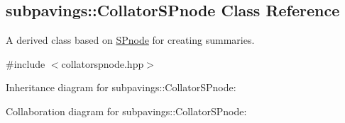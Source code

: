 \hypertarget{classsubpavings_1_1CollatorSPnode}{\subsection{subpavings\-:\-:\-Collator\-S\-Pnode \-Class \-Reference}
\label{classsubpavings_1_1CollatorSPnode}
}


\-A derived class based on \hyperlink{classsubpavings_1_1SPnode}{\-S\-Pnode} for creating summaries.  




{\ttfamily \#include $<$collatorspnode.\-hpp$>$}



\-Inheritance diagram for subpavings\-:\-:\-Collator\-S\-Pnode\-:


\-Collaboration diagram for subpavings\-:\-:\-Collator\-S\-Pnode\-:
